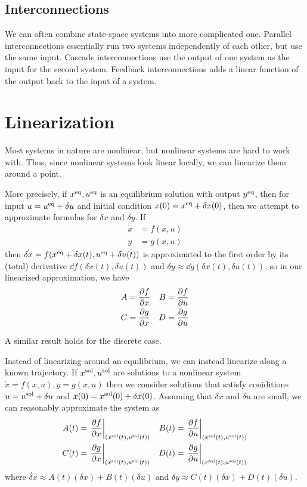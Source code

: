 \subsection{Interconnections}

We can often combine state-space systems into more complicated one. Parallel interconnections essentially run two systems independently of each other, but use the same input. Cascade interconnections use the output of one system as the input for the second system. Feedback interconnections adds a linear function of the output back to the input of a system.

\section{Linearization}

Most systems in nature are nonlinear, but nonlinear systems are hard to work with. Thus, since nonlinear systems look linear locally, we can linearize them around a point. 

More precisely, if $x^\mathrm{eq}, u^\mathrm{eq}$ is an equilibrium solution with output $y^\mathrm{eq}$, then for input $u = u^\mathrm{eq} + \delta u$ and initial condition $x(0) = x^\mathrm{eq} + \delta x(0)$, then we attempt to approximate formulas for $\delta x$ and $\delta y$. If \begin{align*}
    \dot x &= f(x, u)\\
    y &= g(x, u)
\end{align*}
then $\dot {\delta x} = f(x^\mathrm{eq} + \delta x(t), u^\mathrm{eq} + \delta u(t))$ is approximated to the first order by its (total) derivative $\dd{f}(\delta x(t), \delta u(t))$ and $\delta y \approx \dd{g}(\delta x(t), \delta u(t))$, so in our linearized approximation, we have \begin{align*}
    A &= \pdv{f}{x} &B &= \pdv{f}{u}\\
    C &= \pdv{g}{x} &D &= \pdv{g}{u} 
\end{align*}

A similar result holds for the discrete case.

Instead of linearizing around an equilibrium, we can instead linearize along a known trajectory. If $x^\mathrm{sol}, u^\mathrm{sol}$ are solutions to a nonlinear system $\dot x = f(x, u), y = g(x, u)$ then we consider solutions that satisfy coniditions $u = u^\mathrm{sol} + \delta u$ and $x(0) = x^\mathrm{sol}(0) + \delta x(0)$. Assuming that $\delta x$ and $\delta u$ are small, we can reasonably approximate the system as \begin{align*}
    A(t) &= \eval{\pdv{f}{x}}_{\qty(x^\mrm{sol}(t), u^\mrm{sol}(t))} &B(t) &= \eval{\pdv{f}{u}}_{\qty(x^\mrm{sol}(t), u^\mrm{sol}(t))}\\
    C(t) &= \eval{\pdv{g}{x}}_{\qty(x^\mrm{sol}(t), u^\mrm{sol}(t))} &D(t) &= \eval{\pdv{g}{u}}_{\qty(x^\mrm{sol}(t), u^\mrm{sol}(t))} 
\end{align*}
where $\dot{\delta x} \approx A(t)(\delta x) + B(t)(\delta u)$ and $\delta y \approx C(t)(\delta x) + D(t)(\delta u)$.


